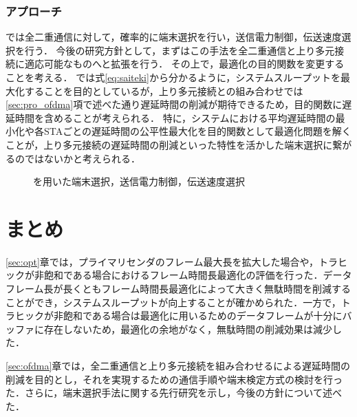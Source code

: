 \documentclass[technicalreport]{ieicej}
\begin{document}
		\begin{comment}
			&{\rm subject\ to} &&\sum_{j\in\{j:(i,j)\in{\mathcal C}\}} p^{(i,j)}\geq\eta_d^{(i)} \\
			&&&\sum_{i\in\{i:(i,j)\in{\mathcal C}\}} p^{(i,j)}\geq\eta_u^{(j)} \\
			&&&\sum_{(i,j)\in{\mathcal C}} p^{(i,j)}=1 \\

			\begin{equation}
				p_d^{(i)}=\sum_{j}p^{(i,j)}
			\end{equation}

			\begin{align}
				p_u^{(i,j)} &= p^{(i,j)}/p_d^{(i)} \\
				{\rm CW}_u^{(i,j)} &=\lceil 1/p_u^{(i,j)}\rceil
			\end{align}

			\begin{equation}
				{\rm SINR}_d \geq {\rm SNR}_d - \delta
			\end{equation}
			上式によりSINR$_d$の最低値が保証されている
		\end{comment}

		\subsubsection{アプローチ}
		\cite{pro-mac}では全二重通信に対して，確率的に端末選択を行い，送信電力制御，伝送速度選択を行う．
		今後の研究方針として，まずはこの手法を全二重通信と上り多元接続に適応可能なものへと拡張を行う．
		その上で，最適化の目的関数を変更することを考える．
		\cite{pro-mac}では式\eqref{eq:saiteki}から分かるように，システムスループットを最大化することを目的としているが，上り多元接続との組み合わせでは\ref{sec:pro_ofdma}項で述べた通り遅延時間の削減が期待できるため，目的関数に遅延時間を含めることが考えられる．
		特に，システムにおける平均遅延時間の最小化や各STAごとの遅延時間の公平性最大化を目的関数として最適化問題を解くことが，上り多元接続の遅延時間の削減といった特性を活かした端末選択に繋がるのではないかと考えられる．

		\begin{figure}[t]
			\centering
			\caption{\cite{pro-mac}を用いた端末選択，送信電力制御，伝送速度選択}
			\label{fig:probab}
		\end{figure}
\section{まとめ}
\ref{sec:opt}章では，プライマリセンダのフレーム最大長を拡大した場合や，トラヒックが非飽和である場合におけるフレーム時間長最適化の評価を行った．データフレーム長が長くともフレーム時間長最適化によって大きく無駄時間を削減することができ，システムスループットが向上することが確かめられた．一方で，トラヒックが非飽和である場合は最適化に用いるためのデータフレームが十分にバッファに存在しないため，最適化の余地がなく，無駄時間の削減効果は減少した．
\par
\ref{sec:ofdma}章では，全二重通信と上り多元接続を組み合わせるによる遅延時間の削減を目的とし，それを実現するための通信手順や端末検定方式の検討を行った．さらに，端末選択手法に関する先行研究を示し，今後の方針について述べた．
\end{document}
